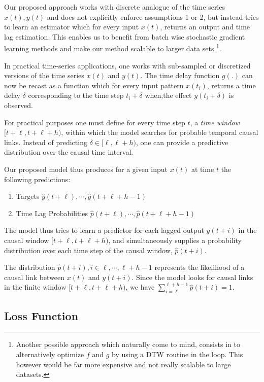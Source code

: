 \documentclass[envcountsect,runningheads]{llncs}
\theoremstyle{etoile}
\begin{document}
Our proposed approach works with discrete analogue of the time series $x(t), y(t)$ 
and does not explicitly enforce assumptions 1 or 2, but instead tries to learn an 
estimator which for every input $x(t)$, returns an output and time lag estimation. 
This enables us to benefit from batch wise stochastic gradient learning methods and 
make our method scalable to larger data sets \footnote{Another possible approach which 
naturally come to mind, consists in to alternatively optimize $f$ and $g$ by using a 
DTW routine in the loop. This however would be far more expensive and not 
really scalable to large datasets.}.

In practical time-series applications, one works with sub-sampled or discretized versions of the time 
series $x(t)$ and $y(t)$. The time delay function $g(.)$ can now be recast as a function which for 
every input pattern $x(t_i)$, returns a time delay $\delta$ corresponding to the time step 
$t_i + \delta$ when,the effect $y(t_i + \delta)$ is observed.

For practical purposes one must define for every time step $t$, a \emph{time window} 
$[t+\ell, t+\ell+h)$, within which the model searches for probable temporal causal links. 
Instead of predicting $\delta \in [\ell, \ell+h)$, one can provide a predictive distribution 
over the causal time interval.

Our proposed model thus produces for a given input $x(t)$ at time $t$ the following predictions:

\begin{enumerate}
\item Targets $\hat{y}(t+\ell), \cdots, \hat{y}(t+\ell+h-1)$
\item Time Lag Probabilities $\hat{p}(t+\ell), \cdots, \hat{p}(t+\ell+h-1)$
\end{enumerate}

The model thus tries to learn a predictor for each lagged output $y(t+i)$ in the causal window 
$[t+\ell, t+\ell+h)$, and simultaneously supplies a probability distribution over each time step 
of the causal window, $\hat{p}(t+i)$.

The distribution $\hat{p}(t+i), i \in {\ell, \cdots, \ell+h-1}$ represents the 
likelihood of a causal link between $x(t)$ and $y(t+i)$. Since the model looks
for causal links in the finite window $[t+\ell, t+\ell+h)$, we have 
$\sum^{\ell+h-1}_{i = \ell}{\hat{p}(t + i)} = 1$.


\subsection{Loss Function}
\end{document}

